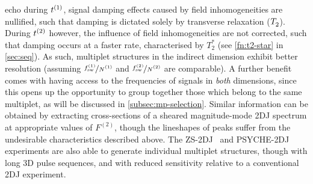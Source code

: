 echo during $t^{(1)}$, signal damping effects caused by field inhomogeneities are
nullified, such that damping is dictated solely by transverse relaxation
($T_2^{\vphantom{*}}$). During $t^{(2)}$ however, the influence of field inhomogeneities are not
corrected, such that damping occurs at a faster rate, characterised by $T_2^*$
(see \cref{fn:t2-star} in \cref{sec:seq}).
As such, multiplet structures in the indirect dimension exhibit better
resolution (assuming $\nicefrac{\fswone}{\None}$ and
$\nicefrac{\fswtwo}{\Ntwo}$ are comparable).
A further benefit comes with having access to the frequencies of
signals in \emph{both} dimensions, since this opens up the opportunity to group
together those which belong to the same multiplet, as will be discussed in
\cref{subsec:mp-selection}.
Similar information can be obtained
by extracting cross-sections of a sheared magnitude-mode \ac{2DJ} spectrum at
appropriate values of $F^{(2)}$, though the lineshapes of peaks suffer from the
undesirable characteristics described above. The
\ac{ZS}-\ac{2DJ}~\cite{Pell2007} and
\ac{PSYCHE}-\ac{2DJ}~\cite{Foroozandeh2015,Kiraly2017} experiments are also able
to generate individual multiplet structures, though with long \ac{3D} pulse
sequences, and with reduced sensitivity relative to a conventional \ac{2DJ}
experiment.

